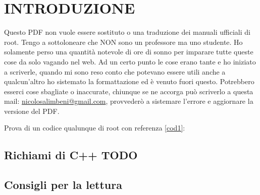 \chapter{INTRODUZIONE}
Questo PDF non vuole essere sostituto o una traduzione dei manuali ufficiali di root. Tengo a sottoloneare che NON sono un professore ma uno studente. Ho solamente perso una quantità notevole di ore di sonno per imparare tutte queste cose da solo vagando nel web. Ad un certo punto le cose erano tante e ho iniziato a scriverle, quando mi sono reso conto che potevano essere utili anche a qualcun'altro ho sistemato la formattazione ed è venuto fuori questo. Potrebbero esserci cose sbagliate o inaccurate, chiunque se ne accorga può scriverlo a questa mail: \url{nicolosalimbeni@gmail.com}, provvederò a sistemare l'errore e aggiornare la versione del PDF. 

Prova di un codice qualunque di root con referenza \ref{cod1}:\\



\section{Richiami di C++ TODO}

\section{Consigli per la lettura}